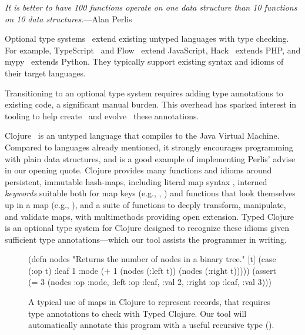 \emph{It is better to have 100 functions operate on one data structure than 10 functions on 10 data structures.}---Alan Perlis

Optional type systems~\cite{bracha2004pluggable} extend existing untyped languages
with type checking.
For example,
TypeScript~\cite{typescript} and Flow~\cite{flow} extend
JavaScript,
Hack~\cite{hack} extends PHP,
and
mypy~\cite{mypy} extends Python.
They typically support existing syntax and idioms of their target languages.

Transitioning to an optional type system
requires adding type annotations to existing code,
a significant manual burden.
This overhead has sparked interest in 
tooling to help create~\cite{saftoiu2010jstrace,pyannotate,typette18,An10dynamicinference,pytype} and
evolve~\cite{kristensen2017inference}
these annotations.

Clojure~\cite{Hic08} is an untyped language that compiles to the Java
Virtual Machine. Compared to languages already mentioned, it
strongly encourages programming with plain data structures, and is
a good example of implementing Perlis' advise in our opening quote.
Clojure provides
many functions and idioms around persistent, immutable hash-maps,
including literal map syntax , interned \emph{keywords}
suitable both for map keys (e.g., , ) and
functions that look themselves up in a map (e.g., ),
and a suite of functions to deeply transform, manipulate, and validate
maps, with multimethods providing open extension.
Typed Clojure~\cite{bonnaire2016practical} is an optional type system for Clojure
designed to recognize these idioms given sufficient type annotations---which our
tool assists the programmer in writing.

\begin{figure}
\begin{cljlisting}
(defn nodes
  "Returns the number of nodes in a binary tree."
  [t] (case (:op t)
        :leaf 1
        :node (+ 1 (nodes (:left t))
                   (nodes (:right t)))))
(assert (= 3 (nodes
               {:op :node,
                :left {:op :leaf, :val 2},
                :right {:op :leaf, :val 3}})))
\end{cljlisting}
\caption{A typical use of maps in Clojure
to represent records,
that requires type annotations
to check with Typed Clojure.
Our tool %
will automatically annotate this program
with a useful recursive type ().
}
\label{fig:infer:nodes}
\end{figure}

